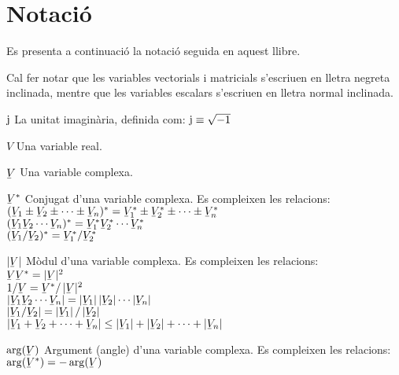 \chapter*{Notaci\'{o}} 

Es presenta a continuaci\'{o} la notaci\'{o} seguida en aquest llibre.

Cal fer notar que les variables vectorials i matricials s'escriuen
en lletra negreta inclinada,  mentre que les variables escalars
s'escriuen en lletra normal inclinada.

\begin{list}{}
{\setlength{\labelwidth}{15mm} \setlength{\leftmargin}{20mm}
\setlength{\labelsep}{5mm}}
    \item[$\mathrm{j}$] La unitat imagin\`{a}ria, definida com:
    $\mathrm{j}\equiv\sqrt{-1}$
    \item[$V$] Una variable real.
    \item[$\cmplx{V}$] Una variable complexa.
    \item[$\cmplx{V}^*$] Conjugat d'una variable complexa.
    Es compleixen les relacions:\\[1ex]
     $(\cmplx{V}_1 \pm \cmplx{V}_2 \pm \cdots  \pm \cmplx{V}_n)^* = \cmplx{V}_1^* \pm
    \cmplx{V}_2^*\pm\cdots\pm\cmplx{V}_n^*$\\[1ex]
    $(\cmplx{V}_1 \cmplx{V}_2 \cdots \cmplx{V}_n)^* = \cmplx{V}_1^*  \cmplx{V}_2^*
    \cdots \cmplx{V}_n^*$\\[1ex]
    $(\cmplx{V}_1 / \cmplx{V}_2)^* = \cmplx{V}_1^* / \cmplx{V}_2^*$
    \item[$|\cmplx{V}|$] M\`{o}dul d'una variable complexa.
    Es compleixen les relacions:\\[1ex]
      $\cmplx{V}\cmplx{V}^* = |\cmplx{V}|^2$\\[1ex]
      $1/ \cmplx{V} = \cmplx{V}^* / \,|\cmplx{V}|^2$\\[1ex]
      $|\cmplx{V}_1 \cmplx{V}_2 \cdots \cmplx{V}_n| =
       |\cmplx{V}_1| \,|\cmplx{V}_2| \cdots |\cmplx{V}_n|$\\[1ex]
       $|\cmplx{V}_1 / \cmplx{V}_2| = |\cmplx{V}_1| \,/ \,|\cmplx{V}_2|$\\[1ex]
      $|\cmplx{V}_1+\cmplx{V}_2+\cdots+\cmplx{V}_n| \leq
      |\cmplx{V}_1| + |\cmplx{V}_2| + \cdots  +|\cmplx{V}_n|$
    \item[$\arg(\cmplx{V})$] Argument (angle) d'una variable complexa.
     Es compleixen les relacions:\\[1ex]
      $\arg(\cmplx{V}^*) = - \arg(\cmplx{V})$\\[1ex]

\end{list}
